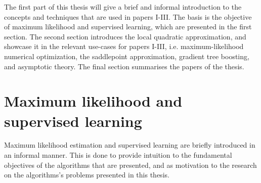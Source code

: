 The first part of this thesis will give a brief and informal introduction to the concepts and techniques that are used in papers I-III.
The basis is the objective of maximum likelihood and supervised learning, which are presented in the first section.
The second section introduces the local quadratic approximation, and showcase it in the relevant use-cases for papers I-III, i.e. maximum-likelihood numerical optimization, the saddlepoint approximation, gradient tree boosting, and asymptotic theory.
The final section summarises the papers of the thesis.
%
%
%
%
%
%
%
%
%
%
%

\chapter{Maximum likelihood and supervised learning}

Maximum likelihood estimation and supervised learning are briefly introduced in an informal manner. %
This is done to provide intuition to the fundamental objectives of the algorithms that are presented, and as motivation to the research on the algorithms's problems presented in this thesis.

